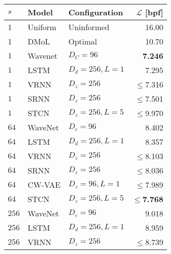 \begin{table}[t!]
    \centering
    \begin{tabular}{lll|r}
        \toprule
        $s$    & \bf Model              & \bf Configuration     & \bf $\mathcal{L}$ [bpf] \\
        \midrule
        1         & Uniform             & Uninformed            & 16.00 \\
        1         & DMoL                & Optimal               & 10.70 \\   %
        \midrule
        $1$       & Wavenet             & $D_C=96$              & \textbf{7.246} \\
        $1$       & LSTM                & $D_d=256, L=1$        & 7.295 \\
        $1$       & VRNN                & $D_z=256$             & $\leq$7.316 \\
        $1$       & SRNN                & $D_z=256$             & $\leq$7.501 \\
        $1$       & STCN                & $D_z=256,L=5$         & $\leq$9.970 \\
        \midrule
        $64$      & WaveNet             & $D_c=96$              & 8.402 \\
        $64$      & LSTM                & $D_d=256, L=1$        & 8.357 \\
        $64$      & VRNN                & $D_z=256$             & $\leq$8.103 \\
        $64$      & SRNN                & $D_z=256$             & $\leq$8.036 \\
        $64$      & CW-VAE              & $D_z=96, L=1$         & $\leq$7.989 \\
        $64$      & STCN                & $D_z=256,L=5$  & $\leq$\textbf{7.768} \\
        \midrule
        $256$      & WaveNet             & $D_c=96$              & 9.018 \\
        $256$      & LSTM                & $D_d=256, L=1$        & 8.959 \\  %
        $256$      & VRNN                & $D_z=256$             & $\leq$8.739 \\

\end{tabular}
\end{table}
